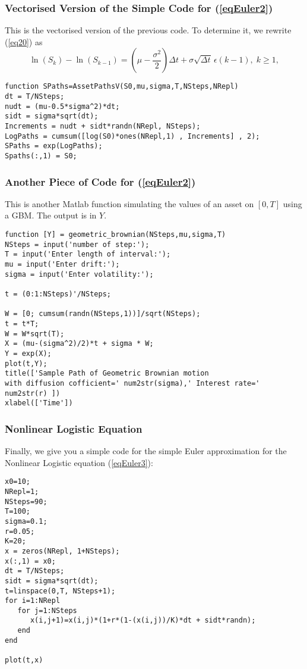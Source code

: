 \documentclass[12pt]{article}
\def\Dd{\Delta}
\def\eps{\epsilon}
\newcommand{\be}{\begin{equation}}
\newcommand{\ee}{\end{equation}}
\begin{document}
\subsubsection{Vectorised Version of the Simple Code for (\ref{eqEuler2})}

This is the vectorised version of the previous code. To determine it, we rewrite (\ref{eq20}) as
\be\label{eq21} \ln(S_k)-\ln(S_{k-1})=(\mu-\frac{\sigma^2}{2})\Dd t
+\sigma\sqrt{\Dd t}\,\eps(k-1),\;k\geq 1, \ee

\begin{verbatim}
function SPaths=AssetPathsV(S0,mu,sigma,T,NSteps,NRepl)
dt = T/NSteps;
nudt = (mu-0.5*sigma^2)*dt;
sidt = sigma*sqrt(dt);
Increments = nudt + sidt*randn(NRepl, NSteps);
LogPaths = cumsum([log(S0)*ones(NRepl,1) , Increments] , 2);
SPaths = exp(LogPaths);
Spaths(:,1) = S0;
\end{verbatim}

\subsubsection{Another Piece of Code for (\ref{eqEuler2})}

This is another Matlab function simulating the values of an asset on $[0,T]$ using a GBM.
The output is in $Y$.

\begin{verbatim}
function [Y] = geometric_brownian(NSteps,mu,sigma,T)
NSteps = input('number of step:');
T = input('Enter length of interval:');
mu = input('Enter drift:');
sigma = input('Enter volatility:');

t = (0:1:NSteps)'/NSteps;

W = [0; cumsum(randn(NSteps,1))]/sqrt(NSteps);
t = t*T;
W = W*sqrt(T);
X = (mu-(sigma^2)/2)*t + sigma * W;
Y = exp(X);
plot(t,Y);
title(['Sample Path of Geometric Brownian motion
with diffusion cofficient=' num2str(sigma),' Interest rate=' num2str(r) ])
xlabel(['Time'])

\end{verbatim}

\newpage

\subsubsection{Nonlinear Logistic Equation}

Finally, we give you a simple code for the simple Euler approximation
for the Nonlinear Logistic equation (\ref{eqEuler3}):

\begin{verbatim}
x0=10;
NRepl=1;
NSteps=90;
T=100;
sigma=0.1;
r=0.05;
K=20;
x = zeros(NRepl, 1+NSteps);
x(:,1) = x0;
dt = T/NSteps;
sidt = sigma*sqrt(dt);
t=linspace(0,T, NSteps+1);
for i=1:NRepl
   for j=1:NSteps
      x(i,j+1)=x(i,j)*(1+r*(1-(x(i,j))/K)*dt + sidt*randn);
   end
end

plot(t,x)
\end{verbatim}
\end{document}
